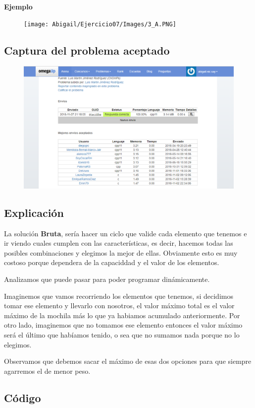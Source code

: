 \documentclass[12pt]{article}
\begin{document}
        \textbf{Ejemplo}    \\
        \begin{figure}[h!]
            \centering
            \texttt{[image: Abigail/Ejercicio07/Images/3\_A.PNG]}
        \end{figure} 
        
\newpage

    \subsection{Captura del problema aceptado}
        \begin{figure}[h!]
            \centering
            \includegraphics[width=1.0\textwidth]{Abigail/Ejercicio06/Images/2_A.PNG}
        \end{figure} 
      
    \subsection{Explicación}
   		La solución \textbf{Bruta}, sería hacer un ciclo que valide cada elemento que tenemos e ir viendo cuales cumplen con las características, es decir, hacemos todas las posibles combinaciones y elegimos la mejor de ellas. Obviamente esto es muy costoso porque dependera de la capaciddad y el valor de los elementos.
		    
		Analizamos que puede pasar para poder programar dinámicamente.

		Imaginemos que vamos recorriendo los elementos que tenemos, si decidimos tomar ese elemento y llevarlo con nosotros, el valor máximo total es el valor máximo de la mochila más lo que ya habiamos acumulado anteriormente. Por otro lado, imaginemos que no tomamos ese elemento entonces el valor máximo será el último que habíamos tenido, o sea que no sumamos nada porque no lo elegimos.

		Observamos que debemos sacar el máximo de esas dos opciones para que siempre agarremos el de menor peso.

\newpage
    \subsection{Código}
        \inputminted{c++}{Code/3.c}
\end{document}
